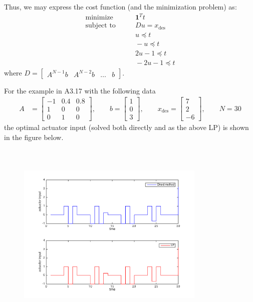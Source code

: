 \documentclass[a4paper,10pt]{article}
\begin{document}
Thus, we may express the cost function (and the minimization problem) as:
\begin{align}
\text{minimize} & \qquad \mathbf{1}^T t \nonumber \\
\text{subject~to} & \qquad Du = x_{\text{des}} \nonumber\\
& \qquad  u \preceq t \nonumber \\
& \qquad  -u \preceq t \nonumber\\
& \qquad 2u-1 \preceq t \nonumber\\
& \qquad-2u-1\preceq t
\end{align}
where $D = \begin{bmatrix}
 A^{N-1}b & A^{N-2}b & \dots &b
\end{bmatrix}$.

For the example in A3.17 with the following data
\begin{align*}
A &= \begin{bmatrix}
-1 & 0.4 & 0.8 \\
1 & 0 & 0 \\
0 & 1 & 0
\end{bmatrix}, \qquad
b = \begin{bmatrix}
1 \\ 0 \\ 3
\end{bmatrix}, \qquad
x_{\text{des}} = \begin{bmatrix}
7 \\ 2 \\ -6
\end{bmatrix}, \qquad N = 30
\end{align*}
the optimal actuator input (solved both directly and as the above LP) is shown in the figure below.
\begin{figure}[ht]
\centering
  \includegraphics[width=9cm, height=9cm]{actuator_input.png}%
\end{figure}
\end{document}
